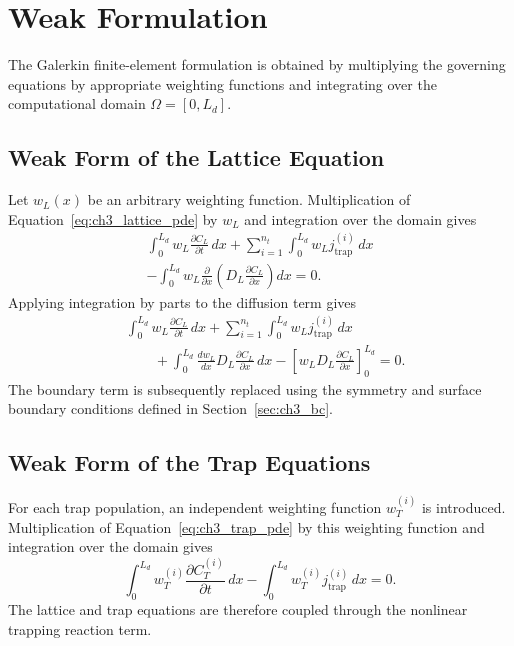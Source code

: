 \documentclass[a4paper,12pt,oneside]{report}
\begin{document}
\section{Weak Formulation}
\label{sec:ch3_weak}

The Galerkin finite-element formulation is obtained by multiplying the governing equations by appropriate weighting functions and integrating over the computational domain $\Omega=[0,L_d]$.

\subsection{Weak Form of the Lattice Equation}

Let $w_L(x)$ be an arbitrary weighting function. Multiplication of Equation~\eqref{eq:ch3_lattice_pde} by $w_L$ and integration over the domain gives
\begin{multline}
\int_0^{L_d}
w_L
\frac{\partial C_L}{\partial t}\,dx
+
\sum_{i=1}^{n_t}
\int_0^{L_d}
w_L
j_{\mathrm{trap}}^{(i)}\,dx
\\
-
\int_0^{L_d}
w_L
\frac{\partial}{\partial x}
\left(
D_L
\frac{\partial C_L}{\partial x}
\right)
dx
=0.
\end{multline}
Applying integration by parts to the diffusion term gives
\begin{align}
&
\int_0^{L_d}
w_L
\frac{\partial C_L}{\partial t}\,dx
+
\sum_{i=1}^{n_t}
\int_0^{L_d}
w_L
j_{\mathrm{trap}}^{(i)}\,dx
\nonumber\\
&\qquad+
\int_0^{L_d}
\frac{dw_L}{dx}
D_L
\frac{\partial C_L}{\partial x}\,dx
-
\left[
w_LD_L
\frac{\partial C_L}{\partial x}
\right]_0^{L_d}
=0.
\label{eq:ch3_weak_lattice}
\end{align}
The boundary term is subsequently replaced using the symmetry and surface boundary conditions defined in Section~\ref{sec:ch3_bc}.

\subsection{Weak Form of the Trap Equations}

For each trap population, an independent weighting function $w_T^{(i)}$ is introduced. Multiplication of Equation~\eqref{eq:ch3_trap_pde} by this weighting function and integration over the domain gives
\begin{equation}
\int_0^{L_d}
w_T^{(i)}
\frac{\partial C_T^{(i)}}{\partial t}\,dx
-
\int_0^{L_d}
w_T^{(i)}
j_{\mathrm{trap}}^{(i)}\,dx
=0.
\label{eq:ch3_weak_trap}
\end{equation}
The lattice and trap equations are therefore coupled through the nonlinear trapping reaction term.
\end{document}
